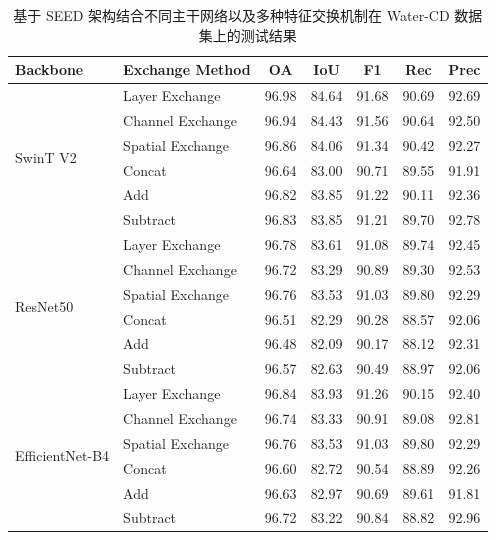 \begin{table}[!htb]
\centering
\caption{基于 SEED 架构结合不同主干网络以及多种特征交换机制在 Water-CD 数据集上的测试结果}
\label{tab:seed_watercd_backbone}
\begin{tabular}{l l c c c c c}
\hline
\textbf{Backbone} & \textbf{Exchange Method} & \textbf{OA} & \textbf{IoU} & \textbf{F1} & \textbf{Rec} & \textbf{Prec} \\
\hline
\multirow{6}{*}{SwinT V2} 
 & Layer Exchange    & 96.98 & 84.64 & 91.68 & 90.69 & 92.69 \\
 & Channel Exchange  & 96.94 & 84.43 & 91.56 & 90.64 & 92.50 \\
 & Spatial Exchange  & 96.86 & 84.06 & 91.34 & 90.42 & 92.27 \\
\cline{2-7}
 & Concat            & 96.64 & 83.00 & 90.71 & 89.55 & 91.91 \\
 & Add               & 96.82 & 83.85 & 91.22 & 90.11 & 92.36 \\ 
 & Subtract             & 96.83 & 83.85 & 91.21 & 89.70 & 92.78 \\
\hline
\multirow{6}{*}{ResNet50} 
 & Layer Exchange    & 96.78 & 83.61 & 91.08 & 89.74 & 92.45 \\
 & Channel Exchange  & 96.72 & 83.29 & 90.89 & 89.30 & 92.53 \\
 & Spatial Exchange  & 96.76 & 83.53 & 91.03 & 89.80 & 92.29 \\
\cline{2-7}
 & Concat            & 96.51 & 82.29 & 90.28 & 88.57 & 92.06 \\
 & Add               & 96.48 & 82.09 & 90.17 & 88.12 & 92.31 \\
 & Subtract             & 96.57 & 82.63 & 90.49 & 88.97 & 92.06 \\
\hline
\multirow{6}{*}{EfficientNet-B4} 
 & Layer Exchange    & 96.84 & 83.93 & 91.26 & 90.15 & 92.40 \\
 & Channel Exchange  & 96.74 & 83.33 & 90.91 & 89.08 & 92.81 \\
 & Spatial Exchange  & 96.76 & 83.53 & 91.03 & 89.80 & 92.29 \\
\cline{2-7}
 & Concat            & 96.60	& 82.72	& 90.54	& 88.89	& 92.26 \\
 & Add               & 96.63	& 82.97	& 90.69	& 89.61	& 91.81 \\
 & Subtract          & 96.72	& 83.22	& 90.84	& 88.82	& 92.96 \\

\hline
\end{tabular}
\end{table}

